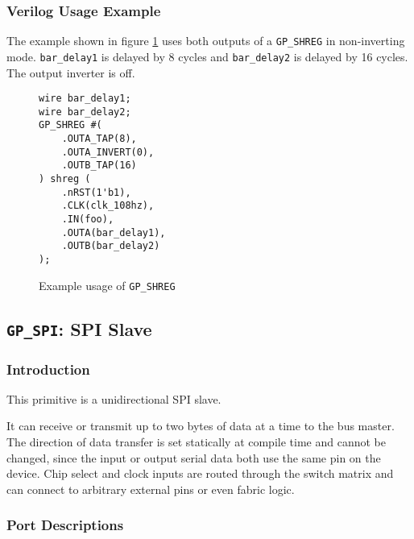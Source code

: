 \documentclass[11pt]{article}
\newcommand{\tokenstyle}[1]{\texttt{#1}}
\newcommand{\wirestyle}[1]{\texttt{#1}}
\begin{document}
\subsubsection{Verilog Usage Example}

The example shown in figure \ref{gp-shreg-example} uses both outputs of a \tokenstyle{GP\_SHREG} in non-inverting mode.
\wirestyle{bar\_delay1} is delayed by 8 cycles and \wirestyle{bar\_delay2} is delayed by 16 cycles. The output inverter is off.

\begin{figure}[h]
\begin{lstlisting}
wire bar_delay1;
wire bar_delay2;
GP_SHREG #(
	.OUTA_TAP(8),
	.OUTA_INVERT(0),
	.OUTB_TAP(16)
) shreg (
	.nRST(1'b1),
	.CLK(clk_108hz),
	.IN(foo),
	.OUTA(bar_delay1),
	.OUTB(bar_delay2)
);
\end{lstlisting}
\caption{Example usage of \tokenstyle{GP\_SHREG}}
\label{gp-shreg-example}
\end{figure}


\pagebreak
\clearpage
\subsection{\tokenstyle{GP\_SPI}: SPI Slave}
\label{gp-spi}

\subsubsection{Introduction}
This primitive is a unidirectional SPI slave.

It can receive or transmit up to two bytes of data at a time to the bus master. The direction of data transfer is set
statically at compile time and cannot be changed, since the input or output serial data both use the same pin on the device.
Chip select and clock inputs are routed through the switch matrix and can connect to arbitrary external pins or even fabric
logic.

\subsubsection{Port Descriptions}
\end{document}
